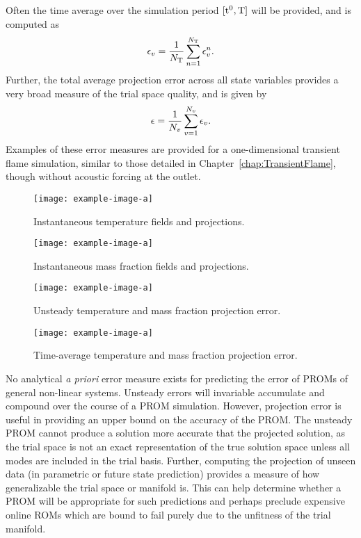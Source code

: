 Often the time average over the simulation period $[\text{t}^0, \text{T}]$ will be provided, and is computed as
%
\begin{equation}
    \epsilon_{v} = \frac{1}{N_{\text{T}}} \sum_{n = 1}^{N_{\text{T}}} \epsilon_{v}^{n}.
\end{equation}
%
Further, the total average projection error across all state variables provides a very broad measure of the trial space quality, and is given by
%
\begin{equation}
    \epsilon = \frac{1}{N_{v}} \sum_{v = 1}^{N_{v}} \epsilon_{v}.
\end{equation}
%
Examples of these error measures are provided for a one-dimensional transient flame simulation, similar to those detailed in Chapter~\ref{chap:TransientFlame}, though without acoustic forcing at the outlet.
%
\begin{figure}
    \begin{minipage}{0.45\linewidth}
        \texttt{[image: example-image-a]}
        \caption{\label{fig:projErrTempField}Instantaneous temperature fields and projections.}
    \end{minipage}
    \hspace{1em}
    \begin{minipage}{0.45\linewidth}
        \texttt{[image: example-image-a]}
        \caption{\label{fig:projErrMFField}Instantaneous mass fraction fields and projections.}
    \end{minipage}
\end{figure}
%
\begin{figure}
    \begin{minipage}{0.45\linewidth}
        \texttt{[image: example-image-a]}
        \caption{\label{fig:projErrTime}Unsteady temperature and mass fraction projection error.}
    \end{minipage}
    \hspace{1em}
    \begin{minipage}{0.45\linewidth}
        \texttt{[image: example-image-a]}
        \caption{\label{fig:projErrAvg}Time-average temperature and mass fraction projection error.}
    \end{minipage}
\end{figure}
%

No analytical \textit{a priori} error measure exists for predicting the error of PROMs of general non-linear systems. Unsteady errors will invariable accumulate and compound over the course of a PROM simulation. However, projection error is useful in providing an upper bound on the accuracy of the PROM. The unsteady PROM cannot produce a solution more accurate that the projected solution, as the trial space is not an exact representation of the true solution space unless all modes are included in the trial basis. Further, computing the projection of unseen data (in parametric or future state prediction) provides a measure of how generalizable the trial space or manifold is. This can help determine whether a PROM will be appropriate for such predictions and perhaps preclude expensive online ROMs which are bound to fail purely due to the unfitness of the trial manifold.